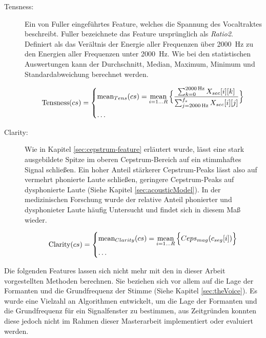 \begin{description}
\item[Tensness:] Ein von Fuller \cite{threeCryTypes} eingeführtes Feature, welches die Spannung des Vocaltraktes beschreibt. Fuller bezeichnete das Feature ursprünglich als \emph{Ratio2}. Definiert als das Verältnis der Energie aller Frequenzen über \SI{2000}{\hertz} zu den Energien aller Frequenzen unter \SI{2000}{\hertz}. Wie bei den statistischen Auswertungen kann der Durchschnitt, Median, Maximum, Minimum und Standardabweichung berechnet werden.

\begin{equation}
\text{Tensness}(cs) = 
\begin{dcases}
\text{mean}_{Tens}(cs) = \operatorname*{mean}_{i=1\ldots R} \Big\{ \frac{\sum_{k=0}^{\SI{2000}{\hertz}} X_{sec}[i][k]}{\sum_{j=\SI{2000}{\hertz}}^{f_{s}} X_{sec}[i][j]} \Big\} \\
\ldots
\end{dcases}
\end{equation}

\item[Clarity: ] Wie in Kapitel \ref{sec:cepstrum-feature} erläutert wurde, lässt eine stark ausgebildete Spitze im oberen Cepstrum-Bereich auf ein stimmhaftes Signal schließen. Ein hoher Anteil stärkerer Cepstrum-Peaks lässt also auf vermehrt phonierte Laute schließen, geringere Cepstrum-Peaks auf dysphonierte Laute (Siehe Kapitel \ref{sec:acousticModel}). In der medizinischen Forschung wurde der relative Anteil phonierter und dysphonieter Laute häufig Untersucht \cite{parentalPerception} und findet sich in diesem Maß wieder.

\begin{equation}
\text{Clarity}(cs) = 
\begin{dcases}
\text{mean}_{Clarity}(cs) = \operatorname*{mean}_{i=1\ldots R} \Big\{ Ceps_{mag}(c_{seg}[i])  \Big\} \\
\ldots
\end{dcases}
\end{equation}
	
	
\end{description}

Die folgenden Features lassen sich nicht mehr mit den in dieser Arbeit vorgestellten Methoden berechnen. Sie beziehen sich vor allem auf die Lage der Formanten und die Grundfrequenz der Stimme (Siehe Kapitel \ref{sec:theVoice}). Es wurde eine Vielzahl an Algorithmen entwickelt, um die Lage der Formanten und die Grundfrequenz für ein Signalfenster zu bestimmen, aus Zeitgründen konnten diese jedoch nicht im Rahmen dieser Masterarbeit implementiert oder evaluiert werden.

